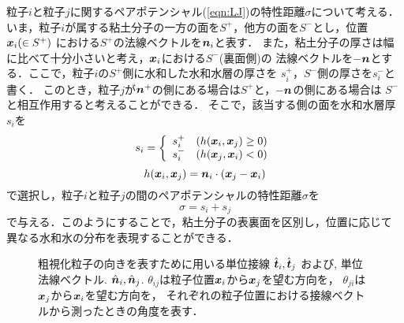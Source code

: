 粒子$i$と粒子$j$に関するペアポテンシャル(\ref{eqn:LJ})の特性距離$\sigma$について考える．
いま，粒子$i$が属する粘土分子の一方の面を$S^+$，他方の面を$S^-$とし，位置$\mbox{\boldmath $x$}_i(\in S^+)$
における$S^+$の法線ベクトルを$\mbox{\boldmath $n$}_i$と表す．
また，粘土分子の厚さは幅に比べて十分小さいと考え，$\mbox{\boldmath $x$}_i$における$S^-$(裏面側)の
法線ベクトルを$-\mbox{\boldmath $n$}$とする．ここで，粒子$i$の$S^+$側に水和した水和水層の厚さを
$s_i^+$，$S^-$側の厚さを$s_i^-$と書く．
このとき，粒子$j$が$\mbox{\boldmath $n$}^+$の側にある場合は$S^+$と，$-\mbox{\boldmath $n$}$の側にある場合は
$S^-$と相互作用すると考えることができる．
そこで，該当する側の面を水和水層厚$s_i$を
\begin{equation}
	s_i=\left\{
	\begin{array}{cc}
		s_i^+ & (h(\mbox{\boldmath $x$}_i,\mbox{\boldmath $x$}_j) \ge 0)\\
		s_i^- & (h(\mbox{\boldmath $x$}_j,\mbox{\boldmath $x$}_i) <0)
	\end{array}
	\right.
	\label{eqn:si_switch}
\end{equation}
\begin{equation}
	h(\mbox{\boldmath $x$}_i,\mbox{\boldmath $x$}_j) =\mbox{\boldmath $n$}_i\cdot \left(\mbox{\boldmath $x$}_j-\mbox{\boldmath $x$}_i\right)
	\label{eqn:h_sgn}
\end{equation}
で選択し，粒子$i$と粒子$j$の間のペアポテンシャルの特性距離$\sigma$を
\begin{equation}
	\sigma=s_i+s_j
	\label{eqn:sig_ij}
\end{equation}
で与える．このようにすることで，粘土分子の表裏面を区別し，位置に応じて
異なる水和水の分布を表現することができる．
\begin{figure}[h]
	\begin{center}
	\end{center}
	\caption{
		粗視化粒子の向きを表すために用いる単位接線
		$\hat{\mbox{\boldmath $t$}}_i,\hat{\mbox{\boldmath $t$}}_j$
		および, 単位法線ベクトル.
		$\hat{\mbox{\boldmath $n$}}_i,\hat{\mbox{\boldmath $n$}}_j$. 
		$\theta_{ij}$は粒子位置$\mbox{\boldmath $x$}_i$から$\mbox{\boldmath $x$}_j$を望む方向を，
		$\theta_{ji}$は$\mbox{\boldmath $x$}_j$から$\mbox{\boldmath $x$}_i$を望む方向を，
		それぞれの粒子位置における接線ベクトルから測ったときの角度を表す．
	} 
	\label{fig:fig9}
\end{figure}
